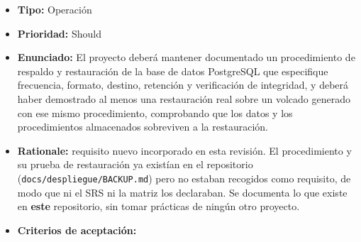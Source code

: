 \documentclass[
  spanish,
]{article}
\providecommand{\tightlist}{%
  \setlength{\itemsep}{0pt}\setlength{\parskip}{0pt}}
\begin{document}
\begin{itemize}
\tightlist
\item
  \textbf{Tipo:} Operación
\item
  \textbf{Prioridad:} Should
\item
  \textbf{Enunciado:} El proyecto deberá mantener documentado un
  procedimiento de respaldo y restauración de la base de datos
  PostgreSQL que especifique frecuencia, formato, destino, retención y
  verificación de integridad, y deberá haber demostrado al menos una
  restauración real sobre un volcado generado con ese mismo
  procedimiento, comprobando que los datos y los procedimientos
  almacenados sobreviven a la restauración.
\item
  \textbf{Rationale:} requisito nuevo incorporado en esta revisión. El
  procedimiento y su prueba de restauración ya existían en el
  repositorio (\texttt{docs/\allowbreak{}despliegue/\allowbreak{}BACKUP.\allowbreak{}md}) pero no estaban
  recogidos como requisito, de modo que ni el SRS ni la matriz los
  declaraban. Se documenta lo que existe en \textbf{este} repositorio,
  sin tomar prácticas de ningún otro proyecto.
\item
  \textbf{Criterios de aceptación:}


\end{itemize}
\end{document}
